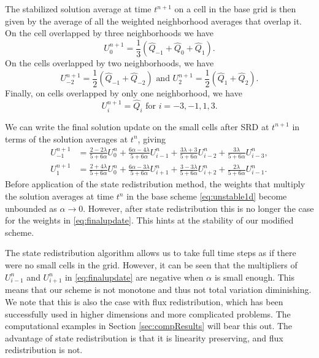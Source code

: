The stabilized solution average at time $t^{n+1}$ on a cell in the base grid is then 
given by the average of all the weighted neighborhood averages that overlap it.  
On the cell overlapped by three neighborhoods we have
\begin{equation} \label{eq:threeneigh}
U^{n+1}_{0} = \frac{1}{3}(\widehat{Q}_{-1}+\widehat{Q}_{0}+\widehat{Q}_{1}).
\end{equation}
On the  cells overlapped by two neighborhoods, we have
\begin{equation} \label{eq:twoneigh}
U^{n+1}_{-2} = \frac{1}{2}(\widehat{Q}_{-1}+\widehat{Q}_{-2}) \text{ and } U^{n+1}_{2} = \frac{1}{2}(\widehat{Q}_{1}+\widehat{Q}_{2}).
\end{equation}
Finally, on cells overlapped by only one neighborhood,  we have
\begin{equation} \label{eq:oneneigh}
	U^{n+1}_i = \widehat{Q}_i \text{ for } i = -3,-1,1,3.
\end{equation}

We can write the final solution update on the small cells after SRD  at $t^{n+1}$ in terms of the solution 
averages at $t^{n}$, giving
\begin{equation}
\begin{aligned}
U^{n+1}_{-1} &= \frac{2-2\lambda}{5+6\alpha}U^n_0 + \frac{6\alpha - 4 \lambda}{5+6\alpha}U^n_{i-1}+ \frac{3\lambda + 3}{5+6\alpha}U^n_{i-2}+\frac{3\lambda }{5+6\alpha}U^n_{i-3}, \\
U^{n+1}_{1} &= \frac{2+4\lambda}{5+6\alpha}U^n_0 + \frac{6\alpha - 3 \lambda}{5+6\alpha}U^n_{i+1}+ \frac{3-3\lambda}{5+6\alpha}U^n_{i+2}+\frac{2\lambda }{5+6\alpha}U^n_{i-1}.
\end{aligned} \label{eq:finalupdate}
\end{equation}
Before application of the state redistribution method, the weights that multiply the solution averages at time $t^n$ in the base scheme \eqref{eq:unstable1d} become unbounded as $\alpha \rightarrow 0$.
However, after state redistribution this is no longer the case for the weights 
in \eqref{eq:finalupdate}.  This hints at the stability of our modified scheme.  

The state redistribution algorithm allows us to take full time steps as if there were no 
small cells in the grid.  However, it can be seen that the multipliers of $U^n_{i-1}$ and $U^n_{i+1}$ 
in \eqref{eq:finalupdate} are negative when $\alpha$ is small enough.  This means that our scheme is not 
monotone and thus not total variation diminishing.  We note that this is also the case 
with flux redistribution, which has been successfully used in higher dimensions and more
complicated problems.  
The computational examples in Section \ref{sec:compResults} will bear this out.  
The advantage of state redistribution  is that it is linearity
preserving, and flux redistribution is not. 

